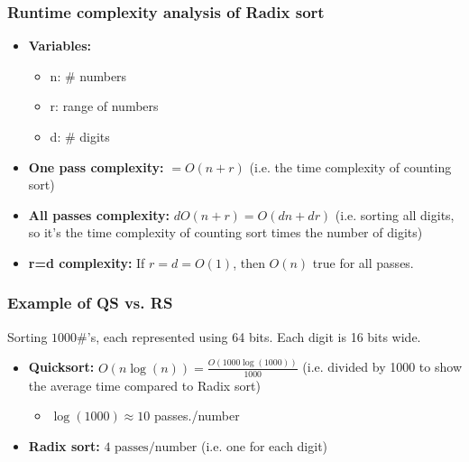 \subsubsection{Runtime complexity analysis of Radix sort}
\begin{definition}
    \begin{itemize}
        \item \textbf{Variables:}
        \begin{itemize}
            \item n: \# numbers 
            \item r: range of numbers 
            \item d: \# digits
        \end{itemize}

        \item \textbf{One pass complexity:} $=O(n+r)$ (i.e. the time complexity of counting sort)
        \item \textbf{All passes complexity:} $dO(n+r) = O(dn + dr)$ (i.e. sorting all digits, so it's the time complexity of counting sort times the number of digits)
        \item \textbf{r=d complexity:} If $r=d=O(1)$, then $O(n)$ true for all passes.
    \end{itemize}
\end{definition}

\subsubsection{Example of QS vs. RS}
\begin{example}
    Sorting $1000\#$'s, each represented using 64 bits. Each digit is 16 bits wide. 
    \begin{itemize}
        \item \textbf{Quicksort:} $O(n \log(n)) = \frac{O(1000 \log(1000))}{1000}$ (i.e. divided by 1000 to show the average time compared to Radix sort)
        \begin{itemize}
            \item $\log(1000) \approx 10$ passes./number
        \end{itemize} 
        \item \textbf{Radix sort:} $4 \text{ passes/number}$ (i.e. one for each digit)
    \end{itemize}
\end{example}

